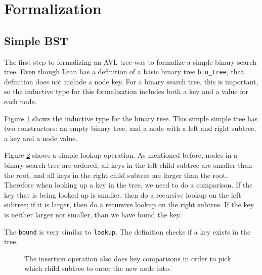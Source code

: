 \section{Formalization}

\subsection{Simple BST}
The first step to formalizing an AVL tree was to formalize a simple binary search tree. Even though Lean has a definition of a basic binary tree 
\lstinline{bin_tree}, that definition does not include a node key. For a binary search tree, this is important, so the inductive type for this formalization includes 
both a key and a value for each node.

\begin{figure}[!ht]
  
  \caption{}
  \label{fig:btree_simple}
\end{figure}

Figure \ref{fig:btree_simple} shows the inductive type for the binary tree. This simple simple tree has two
constructors: an empty binary tree, and a node with a left and right subtree, a key and a node value.

Figure \ref{fig:lookup_simple} shows a simple lookup operation. As mentioned before, nodes in a binary search tree are ordered; all keys in the left child subtree are smaller than the root,
and all keys in the right child subtree are larger than the root. Therefore when looking up a key in the tree, we need to do a comparison. If the key that is being looked up is smaller, then do a recursive lookup
on the left subtree; if it is larger, then do a recursive lookup on the right subtree. If the key is neither larger nor smaller, than we have found the key.

The \lstinline{bound} is very similar to \lstinline{lookup}. The definition checks if a key exists in the tree.

\begin{figure}[!ht]
  
  \caption{}
  \label{fig:lookup_simple}
\end{figure}

\begin{figure}[!ht]
  
  \caption{}
  \label{fig:bound_simple}

The insertion operation also does key comparisons in order to pick which child subtree to enter the new node into.
\end{figure}